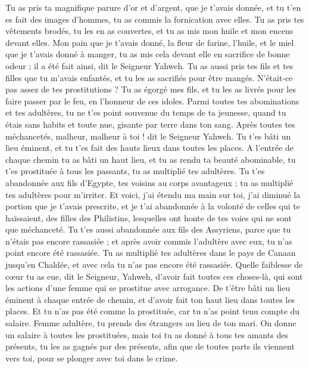 \begin{multicols}{2}
Tu as pris ta magnifique parure d’or et d’argent, que je t'avais donnée, et tu t'en es fait des images d’hommes, tu as commis la fornication avec elles.
Tu as pris tes vêtements brodés,  tu les en as couvertes, et tu as mis mon huile et mon encens devant elles.
Mon pain que je t'avais donné, la fleur de farine, l'huile, et le miel que je t'avais donné à manger, tu as mis cela devant elle en sacrifice de bonne odeur ; il a été fait ainsi, dit le Seigneur Yahweh.
Tu as aussi pris tes fils et tes filles que tu m'avais enfantés, et tu les as sacrifiés pour être mangés. N’était-ce pas assez de tes prostitutions ?
Tu as  égorgé mes fils, et tu les as livrés pour les faire passer par le feu, en l'honneur de ces idoles.
Parmi toutes tes abominations et tes adultères, tu ne t'es point souvenue du temps de ta jeunesse, quand tu étais sans habits et toute nue, gisante par terre dans ton sang.
Après toutes tes méchancetés, malheur, malheur à toi ! dit le Seigneur Yahweh.
Tu t'es bâti un lieu éminent, et tu t'es fait des hauts lieux dans toutes les places.
A l’entrée de chaque chemin tu as bâti un haut lieu, et tu as rendu ta beauté abominable, tu t'es prostituée à tous les passants, tu as multiplié tes adultères.
Tu t'es abandonnée aux fils d'Egypte, tes voisins au corps avantageux ; tu as multiplié tes adultères pour m'irriter.
Et voici, j'ai étendu ma main sur toi, j'ai diminué la portion que je t’avais prescrite, et je t'ai abandonnée à la volonté de celles qui te haïssaient, des filles des Philistins, lesquelles ont honte de tes voies qui ne sont que méchanceté.
Tu t'es aussi abandonnée aux fils des Assyriens, parce que tu n'étais pas encore rassasiée ; et après avoir commis l’adultère avec eux, tu n'as point encore été rassasiée.
Tu as multiplié tes adultères dans le pays de Canaan jusqu’en Chaldée, et avec cela tu n'as pas encore été rassasiée.
Quelle faiblesse de cœur tu as eue, dit le Seigneur, Yahweh, d'avoir fait toutes ces choses-là, qui sont les actions d'une femme qui se prostitue avec arrogance.
De t'être bâti un lieu éminent à chaque entrée de chemin, et d'avoir fait ton haut lieu dans toutes les places. Et tu n’as pas été comme la prostituée, car tu n'as point tenu compte du salaire.
Femme adultère, tu prends des étrangers au lieu de ton mari.
On donne un salaire à toutes les prostituées, mais toi tu as donné à tous tes amants des présents, tu les as gagnés par des présents, afin que de toutes parts ils viennent vers toi, pour se plonger avec toi dans le crime.

\end{multicols}
